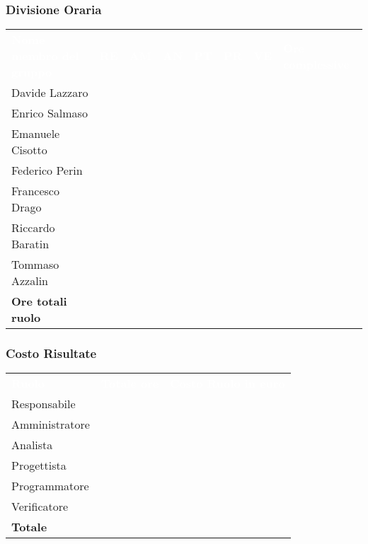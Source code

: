 \subsubsection{Divisione Oraria}
{
	\renewcommand{\arraystretch}{2}
	\centering
	\begin{longtable}{ C{5cm} C{1cm} C{1cm} C{1cm} C{1cm} C{1cm} C{1cm} C{3cm}}
		\textcolor{white}{\textbf{Nome membro del gruppo}} & \textcolor{white}{\textbf{RE}} & \textcolor{white}{\textbf{AM}} & \textcolor{white}{\textbf{AN}} & \textcolor{white}{\textbf{PT}} & \textcolor{white}{\textbf{PR}} & \textcolor{white}{\textbf{VE}} & \textcolor{white}{\textbf{Ore complessive}}\\	
        
        Davide Lazzaro & & & & & & & \\
        Enrico Salmaso & & & & & & & \\
        Emanuele Cisotto & & & & & & & \\
        Federico Perin & & & & & & & \\
        Francesco Drago & & & & & & & \\
        Riccardo Baratin & & & & & & & \\
        Tommaso Azzalin & & & & & & & \\
        \textbf{Ore totali ruolo} & & & & & & & \\
		
	\end{longtable}
}

\subsubsection{Costo Risultate}
{
	\renewcommand{\arraystretch}{2}
	\centering
	\begin{longtable}{ C{3cm} C{2cm} C{4cm}}
		\textcolor{white}{\textbf{Ruolo}} & \textcolor{white}{\textbf{Totale ore}} & \textcolor{white}{\textbf{Costo Ruolo in euro}}\\	
        
        Responsabile & & \\
        Amministratore & & \\
        Analista & & \\
        Progettista & & \\
        Programmatore & & \\
        Verificatore & & \\
        \textbf{Totale} & & \\
		
	\end{longtable}
}

